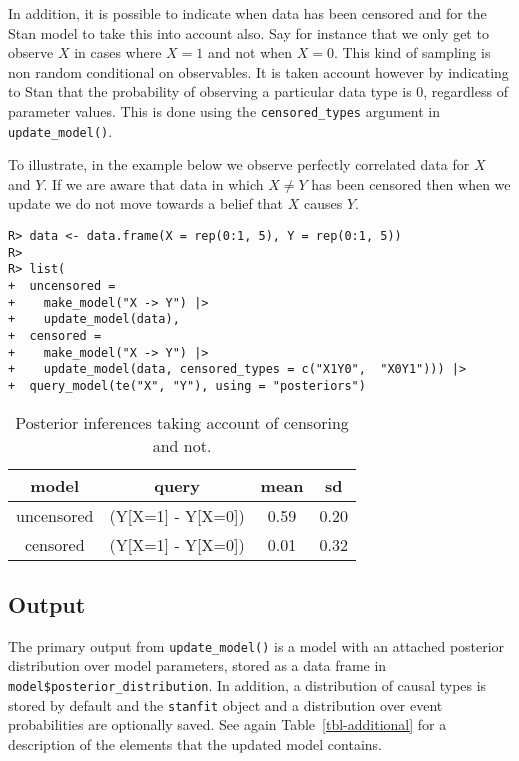 \documentclass[
  11pt,
  article]{jss}
\begin{document}
In addition, it is possible to indicate when data has been censored and
for the Stan model to take this into account also. Say for instance that
we only get to observe \(X\) in cases where \(X=1\) and not when
\(X=0\). This kind of sampling is non random conditional on observables.
It is taken account however by indicating to Stan that the probability
of observing a particular data type is 0, regardless of parameter
values. This is done using the \texttt{censored\_types} argument in
\texttt{update\_model()}.

To illustrate, in the example below we observe perfectly correlated data
for \(X\) and \(Y\). If we are aware that data in which \(X \neq Y\) has
been censored then when we update we do not move towards a belief that
\(X\) causes \(Y\).

\begin{verbatim}
R> data <- data.frame(X = rep(0:1, 5), Y = rep(0:1, 5))
R> 
R> list(
+  uncensored = 
+    make_model("X -> Y") |>
+    update_model(data),
+  censored = 
+    make_model("X -> Y") |>
+    update_model(data, censored_types = c("X1Y0",  "X0Y1"))) |>
+  query_model(te("X", "Y"), using = "posteriors") 
\end{verbatim}

\hypertarget{tbl-censored}{}
\begin{table}
\caption{\label{tbl-censored}Posterior inferences taking account of censoring and not. }\tabularnewline

\centering
\begin{tabular}{cccc}
\toprule
model & query & mean & sd\\
\midrule
uncensored & (Y[X=1] - Y[X=0]) & 0.59 & 0.20\\
censored & (Y[X=1] - Y[X=0]) & 0.01 & 0.32\\
\bottomrule
\end{tabular}
\end{table}

\hypertarget{output}{%
\subsection{Output}\label{output}}

The primary output from \texttt{update\_model()} is a model with an
attached posterior distribution over model parameters, stored as a data
frame in \texttt{model\$posterior\_distribution}. In addition, a
distribution of causal types is stored by default and the
\texttt{stanfit} object and a distribution over event probabilities are
optionally saved. See again Table~\ref{tbl-additional} for a description
of the elements that the updated model contains.
\end{document}
